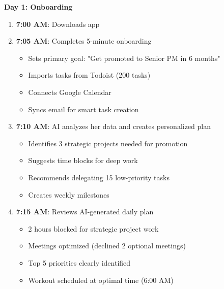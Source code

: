 \textbf{Day 1: Onboarding}
\begin{enumerate}
    \item \textbf{7:00 AM}: Downloads \lifeos{} app
    \item \textbf{7:05 AM}: Completes 5-minute onboarding
    \begin{itemize}
        \item Sets primary goal: "Get promoted to Senior PM in 6 months"
        \item Imports tasks from Todoist (200 tasks)
        \item Connects Google Calendar
        \item Syncs email for smart task creation
    \end{itemize}
    \item \textbf{7:10 AM}: AI analyzes her data and creates personalized plan
    \begin{itemize}
        \item Identifies 3 strategic projects needed for promotion
        \item Suggests time blocks for deep work
        \item Recommends delegating 15 low-priority tasks
        \item Creates weekly milestones
    \end{itemize}
    \item \textbf{7:15 AM}: Reviews AI-generated daily plan
    \begin{itemize}
        \item 2 hours blocked for strategic project work
        \item Meetings optimized (declined 2 optional meetings)
        \item Top 5 priorities clearly identified
        \item Workout scheduled at optimal time (6:00 AM)
    \end{itemize}
\end{enumerate}

